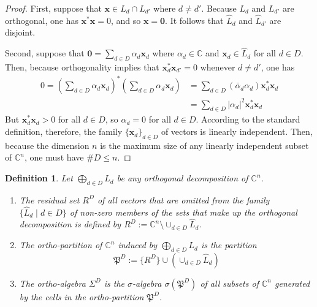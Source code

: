 \documentclass[11pt]{article}
\newcommand \C { \mathbb{C} }
\newtheorem{definition}[theorem]{Definition}
\begin{document}
\begin{proof}
	First, suppose that $ \mathbf x \in L_d \cap L_{d'} $ where $d \ne d'$.
	Because $ L_d $ and $ L_{d'} $ are orthogonal, one has $ \mathbf x^* \mathbf x = 0$,
	and so $ \mathbf {x = 0}$.
	It follows that $ \hat L_d $ and $ \hat L_{d'} $ are disjoint.
	
	Second, suppose that $ \mathbf 0 = \sum _{d \in D} \alpha _d \mathbf x_d $
	where $ \alpha _d \in \C$ and $ \mathbf x_d \in \hat L_d $ for all $d \in D$.
	Then, because orthogonality implies that $ \mathbf x_d ^* \mathbf x_{d'} = 0$ 
	whenever $d \ne d'$, one has
	\begin{align*}
 0 = \left( \sum\nolimits _{d \in D} \alpha _d \mathbf x_d \right) ^*
 		\left( \sum\nolimits _{d \in D} \alpha _d \mathbf x_d \right) 
	  &= \sum\nolimits _{d \in D} ( \bar \alpha _d \alpha _d  ) \mathbf x^*_d \mathbf x_d \\
	  &= \sum\nolimits _{d \in D} | \alpha _d | ^2 \mathbf x^*_d \mathbf x_d
	\end{align*}
	But $ \mathbf x_d ^* \mathbf x_d > 0$ for all $d \in D$, 
	so $ \alpha _d = 0$ for all $d \in D$.
	According to the standard definition, therefore,
	the family $ \{ \mathbf x_d \}_{d \in D} $ of vectors is linearly independent.
	Then, because the dimension $n$ is the maximum size 
	of any linearly independent subset of $ \C^n $,	one must have $ \# D \le n$.  
\end{proof}

\begin{definition} \label{def:orthoAlgebra}
	Let $ \bigoplus _{d \in D} L_d $ be any orthogonal decomposition of $ \C^n $. 
\begin{enumerate}
	\item The \emph{residual set} $ R^D $ of all vectors that are omitted 
	from the family $ \{ \hat L_d \mid d \in D \} $ of non-zero members 
	of the sets that make up the orthogonal decomposition 
	is defined by \( R^D := \C^n \setminus \cup _{d \in D} \hat L_d \).
	\item The \emph{ortho-partition} of $ \C^n $ induced by $ \bigoplus _{d \in D} L_d $ 
	is the partition 
\begin{equation} \label{eq:defFD}
	 \mathfrak P^D := \{ R^D \} \cup \left( \cup _{d \in D} \hat L_d \right)
\end{equation}
%
	\item The \emph{ortho-algebra} $ \Sigma ^D $ 
	is the $ \sigma $-algebra $ \sigma ( \mathfrak P^D )$ 
	of all subsets of $ \C^n $ generated by the cells in the ortho-partition $ \mathfrak P^D $.
\end{enumerate}
\end{definition} 
\end{document}
